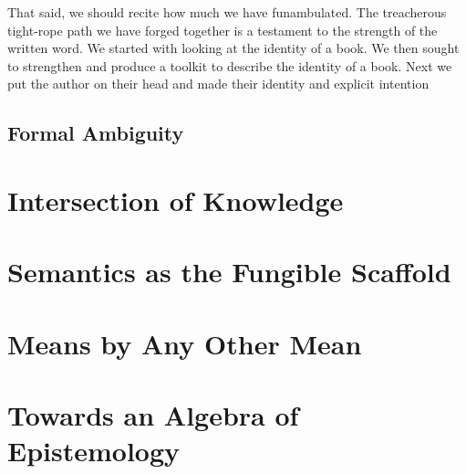 \documentclass[12pt]{article}
\begin{document}
That said, we should recite how much we have funambulated. The treacherous
tight-rope path we have forged together is a testament to the strength of the
written word. We started with looking at the identity of a book. We then sought
to strengthen and produce a toolkit to describe the identity of a book. Next we
put the author on their head and made their identity and explicit intention 

\subsection{Formal Ambiguity}

\section{Intersection of Knowledge}

\section{Semantics as the Fungible Scaffold}

\section{Means by Any Other Mean}

\section{Towards an Algebra of Epistemology}
\end{document}
